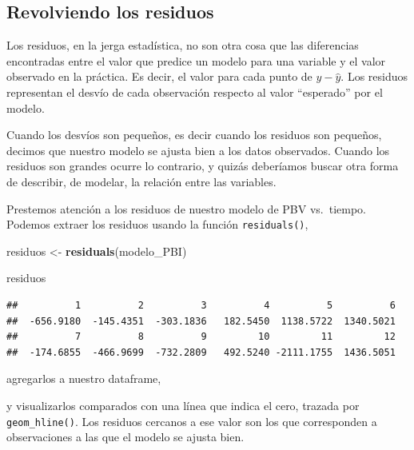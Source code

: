 \documentclass[spanish,]{book}
\newenvironment{Shaded}{\begin{snugshade}}{\end{snugshade}}
\newcommand{\DataTypeTok}[1]{\textcolor[rgb]{0.13,0.29,0.53}{#1}}
\newcommand{\KeywordTok}[1]{\textcolor[rgb]{0.13,0.29,0.53}{\textbf{#1}}}
\newcommand{\NormalTok}[1]{#1}
\newcommand{\OperatorTok}[1]{\textcolor[rgb]{0.81,0.36,0.00}{\textbf{#1}}}
\newcommand{\StringTok}[1]{\textcolor[rgb]{0.31,0.60,0.02}{#1}}
\begin{document}
\hypertarget{revolviendo-los-residuos}{%
\subsection{Revolviendo los residuos}\label{revolviendo-los-residuos}}

Los residuos, en la jerga estadística, no son otra cosa que las diferencias encontradas entre el valor que predice un modelo para una variable y el valor observado en la práctica. Es decir, el valor para cada punto de \(y - \widehat{y}\). Los residuos representan el desvío de cada observación respecto al valor ``esperado'' por el modelo.

Cuando los desvíos son pequeños, es decir cuando los residuos son pequeños, decimos que nuestro modelo se ajusta bien a los datos observados. Cuando los residuos son grandes ocurre lo contrario, y quizás deberíamos buscar otra forma de describir, de modelar, la relación entre las variables.

Prestemos atención a los residuos de nuestro modelo de PBV vs.~tiempo. Podemos extraer los residuos usando la función \texttt{residuals()},

\begin{Shaded}
\begin{Highlighting}[]
\NormalTok{residuos <-}\StringTok{ }\KeywordTok{residuals}\NormalTok{(modelo_PBI)}

\NormalTok{residuos}
\end{Highlighting}
\end{Shaded}

\begin{verbatim}
##          1          2          3          4          5          6 
##  -656.9180  -145.4351  -303.1836   182.5450  1138.5722  1340.5021 
##          7          8          9         10         11         12 
##  -174.6855  -466.9699  -732.2809   492.5240 -2111.1755  1436.5051
\end{verbatim}

agregarlos a nuestro dataframe,

\begin{Shaded}
\end{Shaded}

y visualizarlos comparados con una línea que indica el cero, trazada por \texttt{geom\_hline()}. Los residuos cercanos a ese valor son los que corresponden a observaciones a las que el modelo se ajusta bien.
\end{document}
